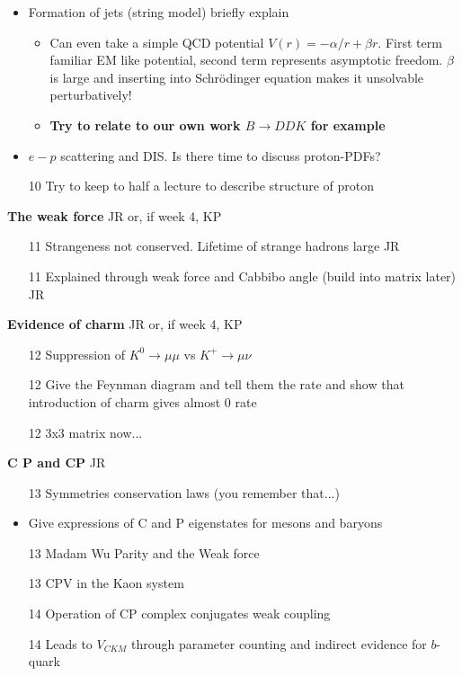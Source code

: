 \begin{itemize}
\begin{itemize}
\end{itemize}
\item Formation of jets (string model) briefly explain
\begin{itemize}
\item Can even take a simple QCD potential $V(r)=-\alpha/r+\beta r$. First term familiar EM like potential, second term represents asymptotic freedom. $\beta$ is large and inserting into Schr\"odinger equation makes it unsolvable perturbatively!
\item {\bf Try to relate to our own work $B\to DDK$ for example}
\end{itemize}
\item $e-p$ scattering and DIS. Is there time to discuss proton-PDFs?
\item[10] Try to keep to half a lecture to describe structure of proton 
\end{itemize}

{\bf The weak force} JR or, if week 4, KP
\begin{itemize}
\item[11] Strangeness not conserved. Lifetime of strange hadrons large JR
\item[11] Explained through weak force and Cabbibo angle (build into matrix later) JR
\end{itemize}


{\bf Evidence of charm} JR or, if week 4, KP
\begin{itemize}
\item[12] Suppression of $K^0\to\mu\mu$ vs $K^{+}\to\mu\nu$
\item[12] Give the Feynman diagram and tell them the rate and show that introduction of charm
gives almost 0 rate
\item[12] 3x3 matrix now...
\end{itemize}

{\bf C P and CP} JR
\begin{itemize}
\item[13] Symmetries conservation laws (you remember that...)
\item Give expressions of C and P eigenstates for mesons and baryons
\item[13] Madam Wu Parity and the Weak force
\item[13] CPV in the Kaon system
\item[14] Operation of CP complex conjugates weak coupling 
\item[14] Leads to $V_{CKM}$ through parameter counting and indirect evidence for $b$-quark
\end{itemize}


